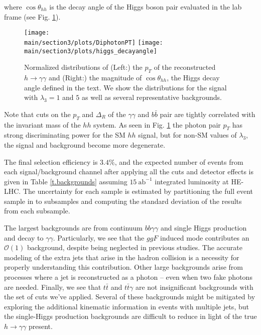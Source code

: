 where $\cos\theta_{hh}$ is the decay angle of the Higgs boson pair evaluated in the lab frame (see Fig. \ref{fig:kinematics}).

\begin{figure}[ht]
\centering
	\texttt{[image: \\main/section3/plots/DiphotonPT]}%
\hfill
	\texttt{[image: \\main/section3/plots/higgs\_decayangle]}%
\caption{Normalized distributions of (Left:) the $p_T$ of the reconstructed $h\rightarrow\gamma\gamma$ and (Right:) the magnitude of $\cos\theta_{hh}$, the Higgs decay angle defined in the text. We show the distributions for the signal with $\lambda_{3} = 1$ and $5$ as well as several representative backgrounds.}
\label{fig:kinematics}
\end{figure}

Note that cuts on the $p_T$ and $\Delta_R$ of the $\gamma\gamma$ and $b\bar{b}$ pair are tightly correlated with the invariant mass of the $hh$ system. As seen in Fig. \ref{fig:kinematics} the photon pair $p_T$ has strong discriminating power for the SM $hh$ signal, but for non-SM values of $\lambda_{3}$, the signal and background become more degenerate.

The final selection efficiency is $3.4 \%$, and the expected number of events from each signal/background channel after applying all the cuts and detector effects is given in Table \ref{t.backgrounds} assuming $15~\text{ab}^{-1}$ integrated luminosity at HE-LHC. The uncertainty for each sample is estimated by partitioning the full event sample in to subsamples and computing the standard deviation of the results from each subsample.

The largest backgrounds are from continuum $bb\gamma\gamma$ and single Higgs production and decay to $\gamma\gamma$. Particularly, we see that the $ggF$ induced mode contributes an $\mathcal{O}(1)$ background, despite being neglected in previous studies. The accurate modeling of the extra jets that arise in the hadron collision is a necessity for properly understanding this contribution.
Other large backgrounds arise from processes where a jet is reconstructed as a photon -- even when two fake photons are needed. Finally, we see that $t\bar{t}$ and $t\bar{t}\gamma$ are not insignificant backgrounds with the set of cuts we've applied. Several of these backgrounds might be mitigated by exploring the additional kinematic information in events with multiple jets, but the single-Higgs production backgrounds are difficult to reduce in light of the true $h\rightarrow \gamma\gamma$ present.

